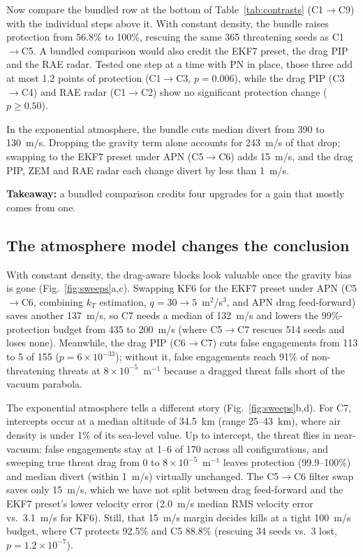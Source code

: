 \documentclass[conference,letterpaper]{IEEEtran}
\begin{document}
Now compare the bundled row at the bottom of Table~\ref{tab:contrasts} (C1$\to$C9) with the individual steps above it.
With constant density, the bundle raises protection from 56.8\% to 100\%, rescuing the same 365 threatening seeds as C1$\to$C5.
A bundled comparison would also credit the EKF7 preset, the drag PIP and the RAE radar.
Tested one step at a time with PN in place, those three add at most 1.2 points of protection (C1$\to$C3, $p = 0.006$), while the drag PIP (C3$\to$C4) and RAE radar (C1$\to$C2) show no significant protection change ($p \ge 0.50$).

In the exponential atmosphere, the bundle cuts median divert from 390 to 130~m/s.
Dropping the gravity term alone accounts for 243~m/s of that drop; swapping to the EKF7 preset under APN (C5$\to$C6) adds 15~m/s, and the drag PIP, ZEM and RAE radar each change divert by less than 1~m/s.

\textbf{Takeaway:} a bundled comparison credits four upgrades for a gain that mostly comes from one.

\subsection{The atmosphere model changes the conclusion}

With constant density, the drag-aware blocks look valuable once the gravity bias is gone (Fig.~\ref{fig:sweeps}a,c).
Swapping KF6 for the EKF7 preset under APN (C5$\to$C6, combining $k_T$ estimation, $q = 30\to5$~m$^2$/s$^3$, and APN drag feed-forward) saves another 137~m/s, so C7 needs a median of 132~m/s and lowers the 99\%-protection budget from 435 to 200~m/s (where C5$\to$C7 rescues 514 seeds and loses none).
Meanwhile, the drag PIP (C6$\to$C7) cuts false engagements from 113 to 5 of 155 ($p = 6\times10^{-33}$); without it, false engagements reach 91\% of non-threatening threats at $8\times10^{-5}$~m$^{-1}$ because a dragged threat falls short of the vacuum parabola.

The exponential atmosphere tells a different story (Fig.~\ref{fig:sweeps}b,d).
For C7, intercepts occur at a median altitude of 34.5~km (range 25--43~km), where air density is under 1\% of its sea-level value.
Up to intercept, the threat flies in near-vacuum: false engagements stay at 1--6 of 170 across all configurations, and sweeping true threat drag from 0 to $8\times10^{-5}$~m$^{-1}$ leaves protection (99.9--100\%) and median divert (within 1~m/s) virtually unchanged.
The C5$\to$C6 filter swap saves only 15~m/s, which we have not split between drag feed-forward and the EKF7 preset's lower velocity error (2.0~m/s median RMS velocity error vs.\ 3.1~m/s for KF6).
Still, that 15~m/s margin decides kills at a tight 100~m/s budget, where C7 protects 92.5\% and C5 88.8\% (rescuing 34 seeds vs.\ 3 lost, $p = 1.2\times10^{-7}$).
\end{document}
